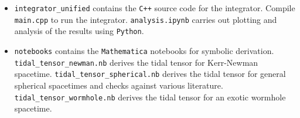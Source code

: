 \documentclass[11pt, twocolumn]{article}
\begin{document}
\begin{itemize}
    \item \texttt{integrator\_unified} contains the \texttt{C++} source code for the integrator.
          \subitem Compile \texttt{main.cpp} to run the integrator.
          \subitem \texttt{analysis.ipynb} carries out plotting and analysis of the results using \texttt{Python}.
    \item \texttt{notebooks} contains the \texttt{Mathematica} notebooks for symbolic derivation.
          \subitem \texttt{tidal\_tensor\_newman.nb} derives the tidal tensor for Kerr-Newman spacetime.
          \subitem \texttt{tidal\_tensor\_spherical.nb} derives the tidal tensor for general spherical spacetimes and checks against various literature.
          \subitem \texttt{tidal\_tensor\_wormhole.nb} derives the tidal tensor for an exotic wormhole spacetime.
\end{itemize}
\end{document}
